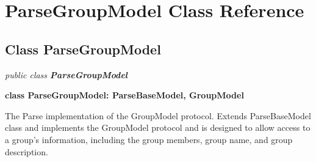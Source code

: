 
\hypertarget{class_ParseGroupModel.iOS}{\section{ParseGroupModel Class Reference}
\label{class_ParseGroupModel.iOS}
}

\subsection*{Class ParseGroupModel}

\textit{public class \textbf{ ParseGroupModel}}

\tab \textbf{class ParseGroupModel: ParseBaseModel, GroupModel}

The Parse implementation of the GroupModel protocol. Extends ParseBaseModel class and implements the GroupModel protocol and is designed to allow access to a group’s information, including the group members, group name, and group description.\\


